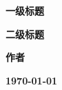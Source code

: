 \begin{titlepage}

    \centering

    \vspace*{4cm}

    \Huge
    \textbf{一级标题}

    \huge
    \textbf{二级标题}

    \vfill

    \textbf{作者}

    \textbf{\today}

    \vspace*{3cm}

\end{titlepage}
